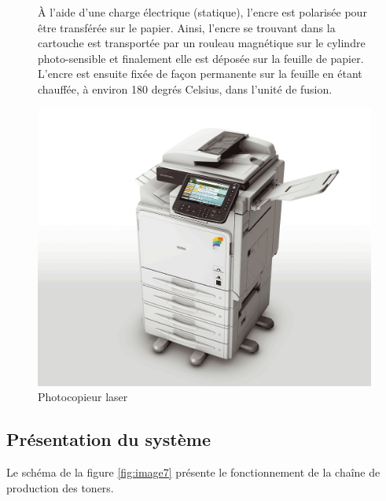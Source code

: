 \begin{figure}[htbp]
\begin{minipage}[c]{.55\linewidth}
À l'aide d'une charge électrique (statique), l'encre est polarisée pour être transférée sur le papier. Ainsi, l'encre se trouvant dans la cartouche est transportée par un rouleau magnétique sur le cylindre photo-sensible et finalement elle est déposée sur la feuille de papier. L'encre est ensuite fixée de façon permanente sur la feuille en étant chauffée, à environ 180 degrés Celsius, dans l'unité de fusion.
\end{minipage}
\hfill
\begin{minipage}[c]{.40\linewidth}
\begin{center}
\includegraphics[width=0.9\linewidth]{img/photocopieur.jpg}
\caption{Photocopieur laser}
\label{fig:image9}
\end{center}
\end{minipage}
\end{figure}

\subsection{Présentation du système}

Le schéma de la figure \ref{fig:image7} présente le fonctionnement de la chaîne de production des toners.

